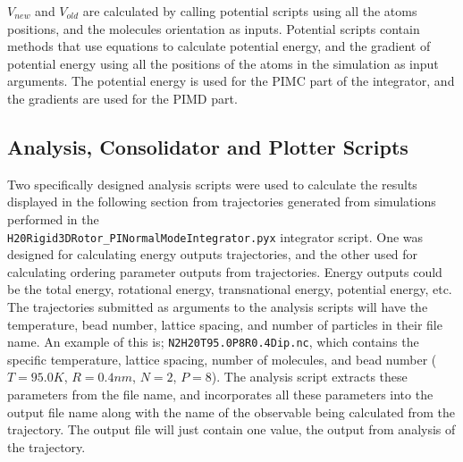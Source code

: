 \documentclass{ece}
\begin{document}
\begin{math} V_{new} \end{math} and \begin{math} V_{old} \end{math} are calculated by calling potential scripts using all the atoms positions, and the molecules orientation as inputs. Potential scripts contain methods that use equations to calculate potential energy, and the gradient of potential energy using all the positions of the atoms in the simulation as input arguments. The potential energy is used for the \gls{PIMC} part of the integrator, and the gradients are used for the \gls{PIMD} part.

\subsection{Analysis, Consolidator and Plotter Scripts}

Two specifically designed analysis scripts were used to calculate the results displayed in the following section from trajectories generated from simulations performed in the \\ \texttt{H20Rigid3DRotor\_PINormalModeIntegrator.pyx} integrator script. One was designed for calculating energy outputs trajectories, and the other used for calculating ordering parameter outputs from trajectories.  Energy outputs could be the total energy, rotational energy, transnational energy, potential energy, etc. The trajectories submitted as arguments to the analysis scripts will have the temperature, bead number, lattice spacing, and number of particles in their file name. An example of this is; \texttt{N2H20T95.0P8R0.4Dip.nc}, which contains the specific temperature, lattice spacing, number of molecules, and bead number (\begin{math} T = 95.0 K \end{math}, \begin{math} R = 0.4 nm \end{math}, \begin{math} N = 2 \end{math}, \begin{math} P = 8 \end{math}). The analysis script extracts these parameters from the file name, and incorporates all these parameters into the output file name along with the name of the observable being calculated from the trajectory. The output file will just contain one value, the output from analysis of the trajectory. 
\end{document}
